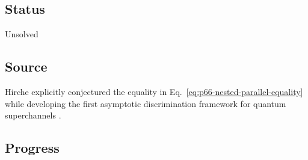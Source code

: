 \subsection*{Status}

Unsolved

\subsection*{Source}

Hirche explicitly conjectured the equality in
Eq.~\eqref{eq:p66-nested-parallel-equality} while developing the first
asymptotic discrimination framework for quantum superchannels
.

\subsection*{Progress}

